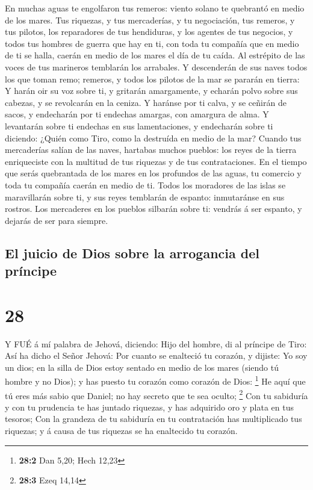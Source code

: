  En muchas aguas te engolfaron tus remeros: viento solano
te quebrantó en medio de los mares.  Tus riquezas, y tus
mercaderías, y tu negociación, tus remeros, y tus pilotos, los
reparadores de tus hendiduras, y los agentes de tus negocios, y todos
tus hombres de guerra que hay en ti, con toda tu compañía que en medio
de ti se halla, caerán en medio de los mares el día de tu caída.
 Al estrépito de las voces de tus marineros temblarán los
arrabales.  Y descenderán de sus naves todos los que toman
remo; remeros, y todos los pilotos de la mar se pararán en tierra:
 Y harán oir su voz sobre ti, y gritarán amargamente, y
echarán polvo sobre sus cabezas, y se revolcarán en la ceniza.
 Y haránse por ti calva, y se ceñirán de sacos, y
endecharán por ti endechas amargas, con amargura de alma. 
Y levantarán sobre ti endechas en sus lamentaciones, y endecharán sobre
ti diciendo: ¿Quién como Tiro, como la destruída en medio de la mar?
 Cuando tus mercaderías salían de las naves, hartabas
muchos pueblos: los reyes de la tierra enriqueciste con la multitud de
tus riquezas y de tus contrataciones.  En el tiempo que
serás quebrantada de los mares en los profundos de las aguas, tu
comercio y toda tu compañía caerán en medio de ti.  Todos
los moradores de las islas se maravillarán sobre ti, y sus reyes
temblarán de espanto: inmutaránse en sus rostros.  Los
mercaderes en los pueblos silbarán sobre ti: vendrás á ser espanto, y
dejarás de ser para siempre.

\hypertarget{el-juicio-de-dios-sobre-la-arrogancia-del-pruxedncipe}{%
\subsection{El juicio de Dios sobre la arrogancia del
príncipe}\label{el-juicio-de-dios-sobre-la-arrogancia-del-pruxedncipe}}

\hypertarget{section-27}{%
\section{28}\label{section-27}}

 Y FUÉ á mí palabra de Jehová, diciendo:  Hijo
del hombre, di al príncipe de Tiro: Así ha dicho el Señor Jehová: Por
cuanto se enalteció tu corazón, y dijiste: Yo soy un dios; en la silla
de Dios estoy sentado en medio de los mares (siendo tú hombre y no
Dios); y has puesto tu corazón como corazón de Dios: \footnote{\textbf{28:2}
  Dan 5,20; Hech 12,23}  He aquí que tú eres más sabio que
Daniel; no hay secreto que te sea oculto; \footnote{\textbf{28:3} Ezeq
  14,14}  Con tu sabiduría y con tu prudencia te has juntado
riquezas, y has adquirido oro y plata en tus tesoros;  Con
la grandeza de tu sabiduría en tu contratación has multiplicado tus
riquezas; y á causa de tus riquezas se ha enaltecido tu corazón.


